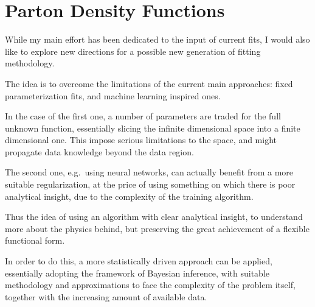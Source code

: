\section{Parton Density Functions}

While my main effort has been dedicated to the input of current \pdf fits, I
would also like to explore new directions for a possible new generation of
fitting methodology.

The idea is to overcome the limitations of the current main approaches: fixed
parameterization fits, and machine learning inspired ones.

In the case of the first one, a number of parameters are traded for the full
unknown function, essentially slicing the infinite dimensional space into a
finite dimensional one.
This impose serious limitations to the space, and might propagate data
knowledge beyond the data region.

The second one, e.g.\ using neural networks, can actually benefit from a more
suitable regularization, at the price of using something on which there is poor
analytical insight, due to the complexity of the training algorithm.
\medskip

 Thus the idea of using an algorithm with clear analytical
insight, to understand more about the physics behind, but preserving the great
achievement of a flexible functional form.

In order to do this, a more statistically driven approach can be applied,
essentially adopting the framework of Bayesian inference, with suitable
methodology and approximations to face the complexity of the problem itself,
together with the increasing amount of available data.
